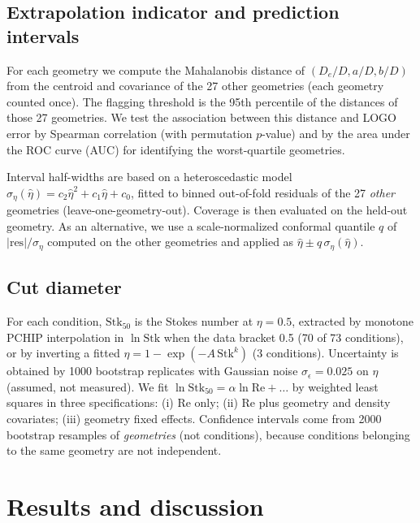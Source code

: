 \documentclass[12pt]{article}
\newcommand{\Stk}{\mathrm{Stk}}
\newcommand{\Rey}{\mathrm{Re}}
\begin{document}
\subsection{Extrapolation indicator and prediction intervals}
For each geometry we compute the Mahalanobis distance of $(D_e/D, a/D, b/D)$ from the centroid and covariance of the 27 other geometries (each geometry counted once). The flagging threshold is the 95th percentile of the distances of those 27 geometries. We test the association between this distance and LOGO error by Spearman correlation (with permutation $p$-value) and by the area under the ROC curve (AUC) for identifying the worst-quartile geometries.

Interval half-widths are based on a heteroscedastic model $\sigma_\eta(\hat\eta) = c_2\hat\eta^2 + c_1\hat\eta + c_0$, fitted to binned out-of-fold residuals of the 27 \emph{other} geometries (leave-one-geometry-out). Coverage is then evaluated on the held-out geometry. As an alternative, we use a scale-normalized conformal quantile $q$ of $|\text{res}|/\sigma_\eta$ computed on the other geometries and applied as $\hat\eta \pm q\,\sigma_\eta(\hat\eta)$.

\subsection{Cut diameter}
For each condition, $\Stk_{50}$ is the Stokes number at $\eta = 0.5$, extracted by monotone PCHIP interpolation in $\ln\Stk$ when the data bracket 0.5 (70 of 73 conditions), or by inverting a fitted $\eta = 1 - \exp(-A\,\Stk^{k})$ (3 conditions). Uncertainty is obtained by 1000 bootstrap replicates with Gaussian noise $\sigma_\epsilon = 0.025$ on $\eta$ (assumed, not measured). We fit $\ln\Stk_{50} = \alpha\ln\Rey + \dots$ by weighted least squares in three specifications: (i) Re only; (ii) Re plus geometry and density covariates; (iii) geometry fixed effects. Confidence intervals come from 2000 bootstrap resamples of \emph{geometries} (not conditions), because conditions belonging to the same geometry are not independent.

\section{Results and discussion}
\end{document}
